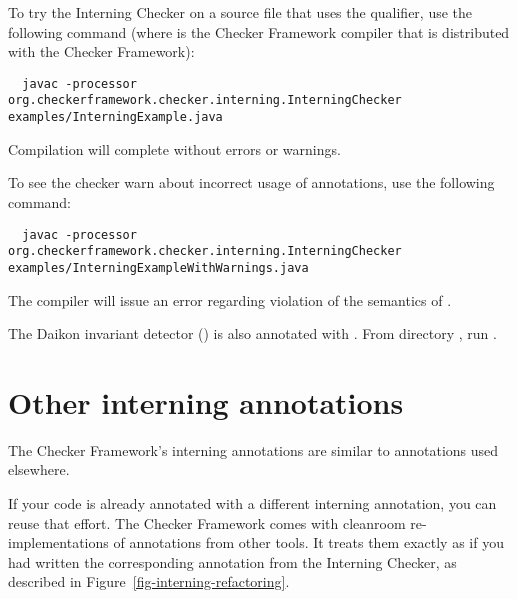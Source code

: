 To try the Interning Checker on a source file that uses the  qualifier,
use the following command (where  is the Checker Framework compiler that
is distributed with the Checker Framework):

\begin{Verbatim}
  javac -processor org.checkerframework.checker.interning.InterningChecker examples/InterningExample.java
\end{Verbatim}

\noindent
Compilation will complete without errors or warnings.

To see the checker warn about incorrect usage of annotations, use the following
command:

\begin{Verbatim}
  javac -processor org.checkerframework.checker.interning.InterningChecker examples/InterningExampleWithWarnings.java
\end{Verbatim}

\noindent
The compiler will issue an error regarding violation of the semantics of
.


The Daikon invariant detector
() is also annotated with
.  From directory ,
run .



\section{Other interning annotations\label{other-interning-annotations}}

The Checker Framework's interning annotations are similar to annotations used
elsewhere.

If your code is already annotated with a different interning
annotation, you can reuse that effort.  The Checker Framework comes with
cleanroom re-implementations of annotations from other tools.  It treats
them exactly as if you had written the corresponding annotation from the
Interning Checker, as described in Figure~\ref{fig-interning-refactoring}.


